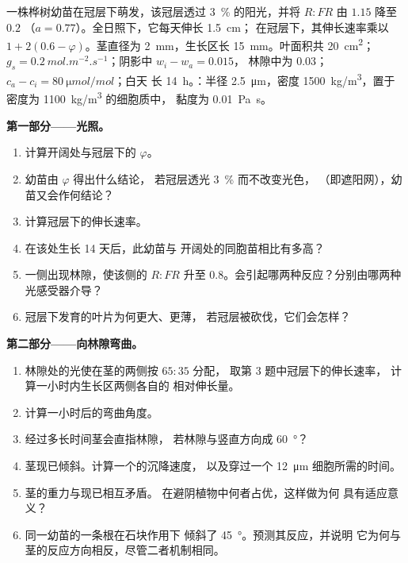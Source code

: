 \begin{problem}
\label{pb:b2:plant-plasticity:1}
一株桦树幼苗在冠层下萌发，该冠层透过
\qty{3}{\%} 的阳光，并将 $R{:}FR$ 由 $1.15$ 降至 $0.2$
（$a = 0.77$）。全日照下，它每天伸长 \qty{1.5}{cm}；
在冠层下，其伸长速率乘以 $1 +
2(0.6 - \varphi)$。茎直径为 \qty{2}{mm}，生长区长
\qty{15}{mm}。叶面积共 \qty{20}{cm^2}；$g_s =
\qty{0.2}{mol.m^{-2}.s^{-1}}$；阴影中 $w_i - w_a = 0.015$，
林隙中为 $0.03$；$c_a - c_i = \qty{80}{\micro mol/mol}$；白天
长 \qty{14}{h}。：半径 \qty{2.5}{\micro m}，密度
\qty{1500}{kg/m^3}，置于密度为 \qty{1100}{kg/m^3} 的细胞质中，
黏度为 \qty{0.01}{Pa.s}。

\medskip
\noindent\textbf{第一部分——光照。}
\begin{enumerate}
  \item 计算开阔处与冠层下的 $\varphi$。
  \item 幼苗由 $\varphi$ 得出什么结论，
        若冠层透光 \qty{3}{\%} 而不改变光色，
        （即遮阳网），幼苗又会作何结论？
  \item 计算冠层下的伸长速率。
  \item 在该处生长 14 天后，此幼苗与
        开阔处的同胞苗相比有多高？
  \item 一侧出现林隙，使该侧的 $R{:}FR$ 升至
        $0.8$。会引起哪两种反应？分别由哪两种
        光感受器介导？
  \item 冠层下发育的叶片为何更大、更薄，
        若冠层被砍伐，它们会怎样？
\end{enumerate}

\medskip
\noindent\textbf{第二部分——向林隙弯曲。}
\begin{enumerate}[resume]
  \item 林隙处的光使在茎的两侧按 $65 : 35$ 分配，
        取第 3 题中冠层下的伸长速率，
        计算一小时内生长区两侧各自的
        相对伸长量。
  \item 计算一小时后的弯曲角度。
  \item 经过多长时间茎会直指林隙，
        若林隙与竖直方向成 \qty{60}{\degree}？
  \item 茎现已倾斜。计算一个的沉降速度，
        以及穿过一个 \qty{12}{\micro m} 细胞所需的时间。
  \item 茎的重力与现已相互矛盾。
        在避阴植物中何者占优，这样做为何
        具有适应意义？
  \item 同一幼苗的一条根在石块作用下
        倾斜了 \qty{45}{\degree}。预测其反应，并说明
        它为何与茎的反应方向相反，尽管二者机制相同。
\end{enumerate}


\end{problem}
